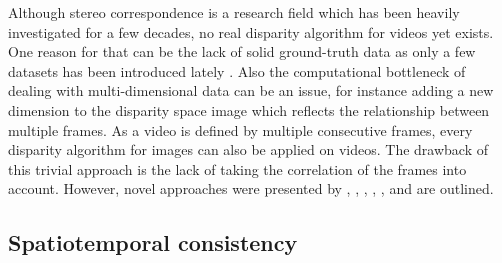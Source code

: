 Although stereo correspondence is a research field which has been heavily investigated for a few decades, no real disparity algorithm for videos yet exists.
One reason for that can be the lack of solid ground-truth data as only a few datasets has been introduced lately \citep{Butler:ECCV:2012, scharstein2014high}.
Also the computational bottleneck of dealing with multi-dimensional data can be an issue, for instance adding a new dimension to the disparity space image which reflects the relationship between multiple frames.
As a video is defined by multiple consecutive frames, every disparity algorithm for images can also be applied on videos.
The drawback of this trivial approach is the lack of taking the correlation of the frames into account.
However, novel approaches were presented by \citeauthor{khoshabeh2011spatio} \citep{khoshabeh2011spatio}, \citeauthor{lee2012local} \citep{lee2012local}, \citeauthor{davis2003spacetime} \citep{davis2003spacetime}, \citeauthor{richardt2010real} \citep{richardt2010real}, \citeauthor{hosni2012temporally} \citep{hosni2012temporally}, and are outlined.

\subsection{Spatiotemporal consistency}

